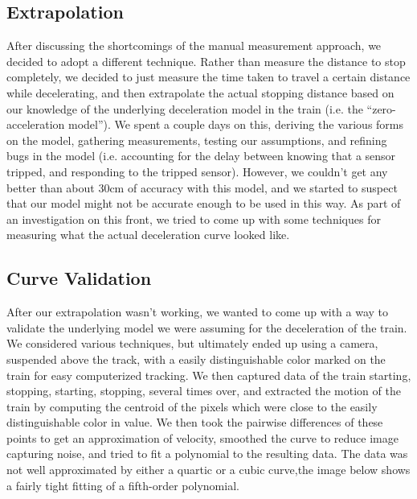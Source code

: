 \documentclass[titlepage]{article}
\begin{document}
\subsection{Extrapolation}
After discussing the shortcomings of the manual measurement approach, we decided
to adopt a different technique. Rather than measure the distance to stop
completely, we decided to just measure the time taken to travel a certain
distance while decelerating, and then extrapolate the actual stopping distance
based on our knowledge of the underlying deceleration model in the train
(i.e. the ``zero-acceleration model''). We spent a couple days on this, deriving the various
forms on the model, gathering measurements, testing our assumptions, and
refining bugs in the model (i.e. accounting for the delay between knowing that
a sensor tripped, and responding to the tripped sensor). However, we couldn't
get any better than about 30cm of accuracy with this model, and we started to
suspect that our model might not be accurate enough to be used in this way. As
part of an investigation on this front, we tried to come up with some techniques
for measuring what the actual deceleration curve looked like.

\subsection{Curve Validation}
After our extrapolation wasn't working, we wanted to come up with a way to
validate the underlying model we were assuming for the deceleration of the
train. We considered various techniques, but ultimately ended up using a
camera, suspended above the track, with a easily distinguishable color marked
on the train for easy computerized tracking. We then captured data of the train
starting, stopping, starting, stopping, several times over, and extracted
the motion of the train by computing the centroid of the pixels which were
close to the easily distinguishable color in value. We then took the pairwise
differences of these points to get an approximation of velocity, smoothed the
curve to reduce image capturing noise, and tried to fit a polynomial to the
resulting data. The data was not well approximated by either a quartic or a
cubic curve,the image below shows a fairly tight fitting of a fifth-order
polynomial.
\end{document}
